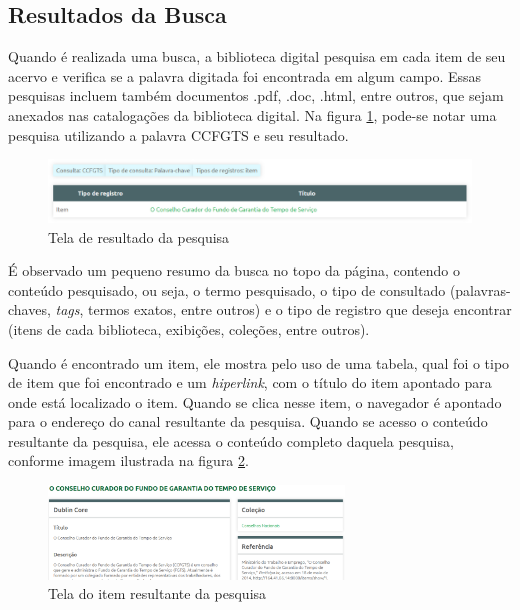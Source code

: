 \subsection*{Resultados da Busca}

Quando é realizada uma busca, a biblioteca digital pesquisa em cada item de seu acervo e verifica se a palavra digitada foi encontrada em algum campo. Essas pesquisas incluem também documentos .pdf, .doc, .html, entre outros, que sejam anexados nas catalogações da biblioteca digital. Na figura \ref{fig:resultante_prototipo}, pode-se notar uma pesquisa utilizando a palavra CCFGTS e seu resultado.

\graphicspath{{figuras/prototipo/}}
\begin{figure}[H]
\centering
\includegraphics[width=1.0\textwidth]{resultado-pesquisa}
\caption{Tela de resultado da pesquisa}
\label{fig:resultante_prototipo}
\end{figure}

É observado um pequeno resumo da busca no topo da página, contendo o conteúdo pesquisado, ou seja, o termo pesquisado, o tipo de consultado (palavras-chaves, \textit{tags}, termos exatos, entre outros) e o tipo de registro que deseja encontrar (itens de cada biblioteca, exibições, coleções, entre outros). 
  
Quando é encontrado um item, ele mostra pelo uso de uma tabela, qual foi o tipo de item que foi encontrado e um \textit{hiperlink}, com o título do item apontado para onde está localizado o item. Quando se clica nesse item, o navegador é apontado para o endereço do canal resultante da pesquisa. Quando se acesso o conteúdo resultante da pesquisa, ele acessa o conteúdo completo daquela pesquisa, conforme imagem ilustrada na figura \ref{fig:resulpesquisa_prototipo}. 

\graphicspath{{figuras/prototipo/}}
\begin{figure}[H]
\centering
\includegraphics[width=0.7\textwidth]{resultante-pesquisa}
\caption{Tela do item resultante da pesquisa}
\label{fig:resulpesquisa_prototipo}
\end{figure}

